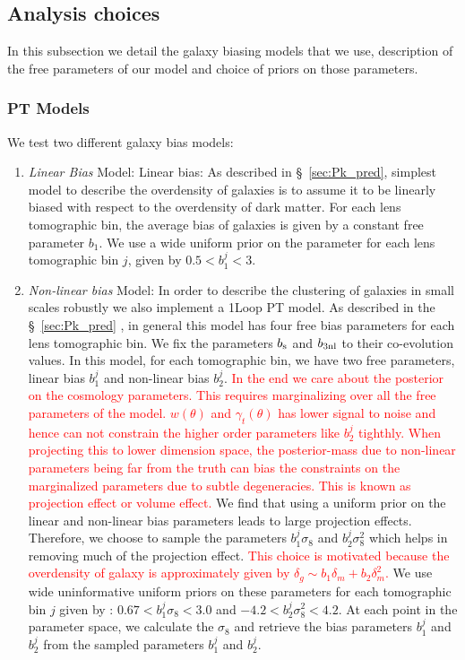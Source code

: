 \documentclass[fleqn,usenatbib]{mnras}
\newcommand{\gammat}{\ensuremath{\gamma_{t}(\theta)}}
\newcommand{\wtheta}{\ensuremath{w(\theta)}}
\newcommand{\red}[1]{\textcolor{red}{#1}}
\begin{document}
\subsection{Analysis choices}
In this subsection we detail the galaxy biasing models that we use, description of the free parameters of our model and choice of priors on those parameters. 
\subsubsection{PT Models}
\label{sec:2x2pt_models}
We test two different galaxy bias models:
\begin{enumerate}
    \item \textit{Linear Bias} Model: Linear bias: As described in \S~\ref{sec:Pk_pred}, simplest model to describe the overdensity of galaxies is to assume it to be linearly biased with respect to the overdensity of dark matter. For each lens tomographic bin, the average bias of galaxies is given by a constant free parameter $b_1$. We use a wide uniform prior on the parameter for each lens tomographic bin $j$, given by $0.5 < b^{j}_1 < 3$. 
    \item \textit{Non-linear bias} Model: 
    In order to describe the clustering of galaxies in small scales robustly we also implement a 1Loop PT model. As described in the \S~\ref{sec:Pk_pred}
    , in general this model has four free bias parameters for each lens tomographic bin. We fix the parameters $b_{\rm s}$ and $b_{\rm 3nl}$ to their co-evolution values. In this model, for each tomographic bin, we have two free parameters, linear bias $b^{j}_1$ and non-linear bias $b^{j}_2$. \red{In the end we care about the posterior on the cosmology parameters. This requires marginalizing over all the free parameters of the model. $\wtheta$ and $\gammat$ has lower signal to noise and hence can not constrain the higher order parameters like $b^j_2$ tighthly. When projecting this to lower dimension space, the posterior-mass due to non-linear parameters being far from the truth can bias the constraints on the marginalized parameters due to subtle degeneracies. This is known as projection effect or volume effect.} We find that using a uniform prior on the linear and non-linear bias parameters leads to large projection effects.  Therefore, we choose to sample the parameters $b^{j}_1 \sigma_8$ and $b^{j}_2 \sigma^2_8$ which helps in removing much of the projection effect. \red{This choice is motivated because the overdensity of galaxy is approximately given by $\delta_g \sim b_1 \delta_m + b_2 \delta_m^2$.} We use wide uninformative uniform priors on these parameters for each tomographic bin $j$ given by : $0.67 < b^{j}_1 \sigma_8 < 3.0$ and $-4.2 < b^{j}_2 \sigma^2_8 < 4.2$. At each point in the parameter space, we calculate the $\sigma_8$ and retrieve the bias parameters $b^{j}_1$ and $b^{j}_2$ from the sampled parameters $b^{j}_1$ and $b^{j}_2$.
\end{enumerate}
\end{document}
